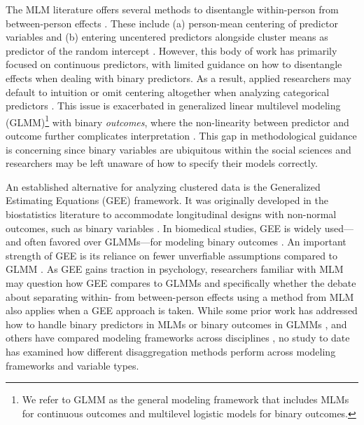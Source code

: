 The MLM literature offers several methods to disentangle within-person from between-person effects \parencite[]{curran_disaggregation_2011}. These include (a) person-mean centering of predictor variables and (b) entering uncentered predictors alongside cluster means as predictor of the random intercept \parencite[]{kreft_effect_1995, raudenbush_hierarchical_2002, bell_explaining_2015}. However, this body of work has primarily focused on continuous predictors, with limited guidance on how to disentangle effects when dealing with binary predictors. As a result, applied researchers may default to intuition or omit centering altogether when analyzing categorical predictors \parencite[]{yaremych_centering_2023}. This issue is exacerbated in generalized linear multilevel modeling (GLMM)\footnote{We refer to GLMM as the general modeling framework that includes MLMs for continuous outcomes and multilevel logistic models for binary outcomes.} with binary \textit{outcomes}, where the non-linearity between predictor and outcome further complicates interpretation \parencite[]{austin_intermediate_2017, bolger_intensive_2013}. This gap in methodological guidance is concerning since binary variables are ubiquitous within the social sciences and researchers may be left unaware of how to specify their models correctly. 


An established alternative for analyzing clustered data is the Generalized Estimating Equations (GEE) framework. It was originally developed in the biostatistics literature to accommodate longitudinal designs with non-normal outcomes, such as binary variables \parencite[]{liang_longitudinal_1986}. In biomedical studies, GEE is widely used—and often favored over GLMMs—for modeling binary outcomes \parencite[cf.][]{diggle_analysis_2002}. An important strength of GEE is its reliance on fewer unverfiable assumptions compared to GLMM \parencite[]{mcneish_unnecessary_2017, hubbard_gee_2010}. As GEE gains traction in psychology, researchers familiar with MLM may question how GEE compares to GLMMs and specifically whether the debate about separating within- from between-person effects using a method from MLM also applies when a GEE approach is taken. While some prior work has addressed how to handle binary predictors in MLMs \parencite{yaremych_centering_2023, enders_centering_2007, raudenbush_hierarchical_2002} or binary outcomes in GLMMs \parencite{bolger_intensive_2013, schunck_within-_2017}, and others have compared modeling frameworks across disciplines \parencite{mcneish_unnecessary_2017, ballinger_using_2004, yan_comparing_2013, muth_alternative_2016, neuhaus_comparison_1991}, no study to date has examined how different disaggregation methods perform across modeling frameworks and variable types. 

